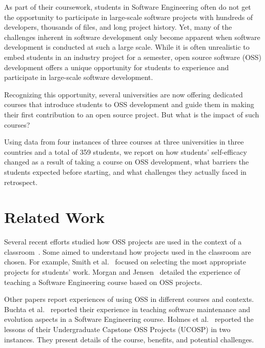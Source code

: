 \documentclass[sigconf]{acmart}
\begin{document}
\begin{sloppy}
As part of their coursework, students in Software Engineering often do not get the opportunity to participate in large-scale software projects with hundreds of developers, thousands of files, and long project history. Yet, many of the challenges inherent in software development only become apparent when software development is conducted at such a large scale. While it is often unrealistic to embed students in an industry project for a semester, open source software (OSS) development offers a unique opportunity for students to experience and participate in large-scale software development. 

Recognizing this opportunity, several universities are now offering dedicated courses that introduce students to OSS development and guide them in making their first contribution to an open source project. But what is the impact of such courses?

Using data from four instances of three courses at three universities in three countries and a total of 359 students, we report on how students' self-efficacy changed as a result of taking a course on OSS development, what barriers the students expected before starting, and what challenges they actually faced in retrospect.

\section{Related Work}


Several recent efforts studied how OSS projects are used in the context of a classroom~\cite{morgan2014lessons, smith2014selecting, buchta2006teaching, coppit2005large, sarma2016training}. Some aimed to understand how projects used in the classroom are chosen. For example, Smith et al.~\cite{smith2014selecting} focused on selecting the most appropriate projects for students' work.  Morgan and Jensen~\cite{morgan2014lessons} detailed the experience of teaching a Software Engineering course based on OSS projects.

Other papers report experiences of using OSS in different courses and contexts. Buchta et al.~\cite{buchta2006teaching} reported their experience in teaching software maintenance and evolution aspects in a Software Engineering course. Holmes et al.~\cite{holmes2014lessons, holmes2018dimensions} reported the lessons of their Undergraduate Capstone OSS Projects (UCOSP) in two instances. They present details of the course, benefits, and potential challenges.


\end{sloppy}
\end{document}
